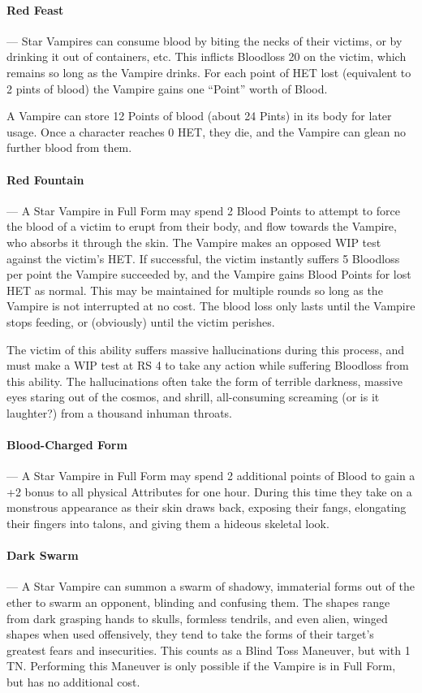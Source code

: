 \documentclass[oneside,11pt,english]{book}
\begin{document}
\paragraph{Red Feast}---\quad
Star Vampires can consume blood by biting the necks of their victims, or by drinking it out of 
containers, etc. This inflicts Bloodloss 20 on the victim, which remains so long as the Vampire 
drinks. For each point of HET lost (equivalent to 2 pints of blood) the Vampire gains one “Point” 
worth of Blood.

A Vampire can store 12 Points of blood (about 24 Pints) in its body for later 
usage. Once a character reaches 0 HET, they die, and the Vampire can glean no further blood 
from them.

\paragraph{Red Fountain}---\quad
A Star Vampire in Full Form may spend 2 Blood Points to attempt to force the blood of a victim 
to erupt from their body, and flow towards the Vampire, who absorbs it through the skin. The 
Vampire makes an opposed WIP test against the victim’s HET. If successful, the victim instantly 
suffers 5 Bloodloss per point the Vampire succeeded by, and the Vampire gains Blood Points 
for lost HET as normal. This may be maintained for multiple rounds so long as the Vampire is 
not interrupted at no cost. The blood loss only lasts until the Vampire stops feeding, or 
(obviously) until the victim perishes.

The victim of this ability suffers massive hallucinations during this process, and must make a 
WIP test at RS 4 to take any action while suffering Bloodloss from this ability. The hallucinations often take the form of terrible darkness, massive eyes staring out of the cosmos, and shrill,
all-consuming screaming (or is it laughter?) from a thousand inhuman throats. 

\paragraph{Blood-Charged Form}---\quad
A Star Vampire in Full Form may spend 2 additional points of Blood to gain a +2 bonus to all 
physical Attributes for one hour. During this time they take on a monstrous appearance as their 
skin draws back, exposing their fangs, elongating their fingers into talons, and giving them a 
hideous skeletal look. 

\paragraph{Dark Swarm}---\quad
A Star Vampire can summon a swarm of shadowy, immaterial forms out of the ether to swarm 
an opponent, blinding and confusing them. The shapes range from dark grasping hands to 
skulls, formless tendrils, and even alien, winged shapes when used offensively, they tend to 
take the forms of their target’s greatest fears and insecurities. This counts as a Blind Toss 
Maneuver, but with 1 TN. Performing this Maneuver  is only possible if the Vampire is in Full 
Form, but has no additional cost. 
\end{document}
